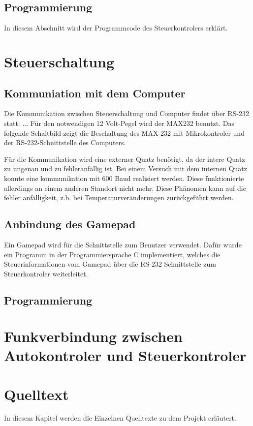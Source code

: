 \documentclass{scrartcl}
\begin{document}
	
	\subsection{Programmierung} %
		In diesem Abschnitt wird der Programmcode des Steuerkontrolers erklärt.

\newpage

\section{Steuerschaltung}

	\subsection{Kommuniation mit dem Computer} %
		Die Kommunikation zwischen Steuerschaltung und Computer findet über RS-232 statt.
		...
		Für den notwendigen 12 Volt-Pegel wird der MAX232 benutzt.
		Das folgende Schaltbild zeigt die Beschaltung des MAX-232 mit Mikrokontroler und der RS-232-Schnittstelle des Computers.

		Für die Kommunikation wird eine externer Quatz benötigt, da der intere Quatz zu ungenau und zu fehleranfällig ist.
		Bei einem Versuch mit dem internen Quatz konnte eine kommunikation mit 600 Baud realisiert werden.
		Diese funktionierte allerdings an einem anderen Standort nicht mehr. Diese Phänomen kann auf die fehler anfälligkeit,
		z.b. bei Temperaturveränderungen zurückgeführt werden.

	\subsection{Anbindung des Gamepad} %
		Ein Gamepad wird für die Schnittstelle zum Benutzer verwendet.
		Dafür wurde ein Programm in der Programmiersprache C implementiert,
		welches die Steuerinformationen vom Gamepad über die RS-232 Schnittstelle zum Steuerkontroler weiterleitet.
	
	\subsection{Programmierung} %

\section{Funkverbindung zwischen Autokontroler und Steuerkontroler} %

\newpage

\section{Quelltext} %
	In diesem Kapitel werden die Einzelnen Quelltexte zu dem Projekt erläutert.



\end{document}
